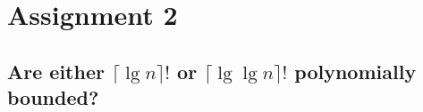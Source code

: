\chapter{Assignment 2}

\section{Are either $\lceil \lg n \rceil!$ or $\lceil \lg \lg n \rceil!$ polynomially bounded?}

